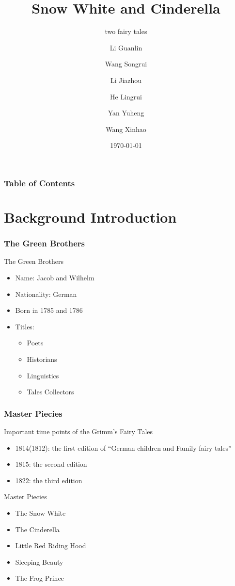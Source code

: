 \documentclass{beamer}
\title[About Snow White and Cinderella]
{Snow White and Cinderella}
\subtitle{two fairy tales}
\author[Eric, Richard] %
{Li Guanlin\inst{1} \and Wang Songrui\inst{1} \and Li Jiazhou\inst{1} \and He Lingrui\inst{1} \and Yan Yuheng\inst{1} \and Wang Xinhao\inst{1}}
\institute[NJU] %
{
\inst{1}%
Undeegraduate in ICS\\
Nanjing University
}
\date[NJU 2023] %
{\today}
\begin{document}
\frame{\titlepage}

\begin{frame}
    \frametitle{Table of Contents}
    \tableofcontents
\end{frame}

\section{Background Introduction}
\begin{frame}
    \frametitle{The Green Brothers}
    \begin{block}{The Green Brothers}
        \begin{itemize}
            \item<1-> Name: Jacob and Wilhelm
            \item<2-> Nationality: German
            \item<3-> Born in 1785 and 1786
            \item<4-> Titles:
                  \begin{itemize}
                      \item Poets
                      \item Historians
                      \item Linguistics
                      \item \alert{Tales Collectors}
                  \end{itemize}
        \end{itemize}
    \end{block}
\end{frame}

\begin{frame}
    \frametitle{Master Piecies}
    \begin{block}{Important time points of the Grimm's Fairy Tales}
        \begin{itemize}
            \item<1-> 1814(1812): the first edition of ``German children and Family fairy tales''
            \item<2-> 1815: the second edition
            \item<3-> 1822: the third edition %
        \end{itemize}
    \end{block}
    \begin{block}{Master Piecies}
        \begin{itemize}
            \item<5-> \alert{The Snow White}
            \item<5-> \alert{The Cinderella}
            \item<4-> Little Red Riding Hood
            \item<4-> Sleeping Beauty
            \item<4-> The Frog Prince
        \end{itemize}
    \end{block}
\end{frame}
\end{document}
